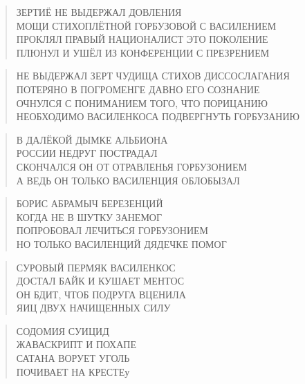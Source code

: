 \poemtitle{***}
\begin{verse}
ЗЕРТИЁ НЕ ВЫДЕРЖАЛ ДОВЛЕНИЯ\\
МОЩИ СТИХОПЛЁТНОЙ ГОРБУЗОВОЙ С ВАСИЛЕНИЕМ\\
ПРОКЛЯЛ ПРАВЫЙ НАЦИОНАЛИСТ ЭТО ПОКОЛЕНИЕ\\
ПЛЮНУЛ И УШЁЛ ИЗ КОНФЕРЕНЦИИ С ПРЕЗРЕНИЕМ
\end{verse}

\poemtitle{***}
\begin{verse}
НЕ ВЫДЕРЖАЛ ЗЕРТ ЧУДИЩА СТИХОВ ДИССОСЛАГАНИЯ\\
ПОТЕРЯНО В ПОГРОМЕНГЕ ДАВНО ЕГО СОЗНАНИЕ\\
ОЧНУЛСЯ С ПОНИМАНИЕМ ТОГО, ЧТО ПОРИЦАНИЮ\\
НЕОБХОДИМО ВАСИЛЕНКОСА ПОДВЕРГНУТЬ ГОРБУЗАНИЮ
\end{verse}

\poemtitle{***}
\begin{verse}
В ДАЛЁКОЙ ДЫМКЕ АЛЬБИОНА\\
РОССИИ НЕДРУГ ПОСТРАДАЛ\\
СКОНЧАЛСЯ ОН ОТ ОТРАВЛЕНЬЯ ГОРБУЗОНИЕМ\\
А ВЕДЬ ОН ТОЛЬКО ВАСИЛЕНЦИЯ ОБЛОБЫЗАЛ
\end{verse}

\poemtitle{***}
\begin{verse}
БОРИС АБРАМЫЧ БЕРЕЗЕНЦИЙ\\
КОГДА НЕ В ШУТКУ ЗАНЕМОГ\\
ПОПРОБОВАЛ ЛЕЧИТЬСЯ ГОРБУЗОНИЕМ\\
НО ТОЛЬКО ВАСИЛЕНЦИЙ ДЯДЕЧКЕ ПОМОГ
\end{verse}

\poemtitle{***}
\begin{verse}
СУРОВЫЙ ПЕРМЯК ВАСИЛЕНКОС\\
ДОСТАЛ БАЙК И КУШАЕТ МЕНТОС\\
ОН БДИТ, ЧТОБ ПОДРУГА ВЦЕНИЛА\\
ЯИЦ ДВУХ НАЧИЩЕННЫХ СИЛУ
\end{verse}

\poemtitle{***}
\begin{verse}
СОДОМИЯ СУИЦИД\\
ЖАВАСКРИПТ И ПОХАПЕ\\
САТАНА ВОРУЕТ УГОЛЬ\\
ПОЧИВАЕТ НА КРЕСТЕу
\end{verse}

